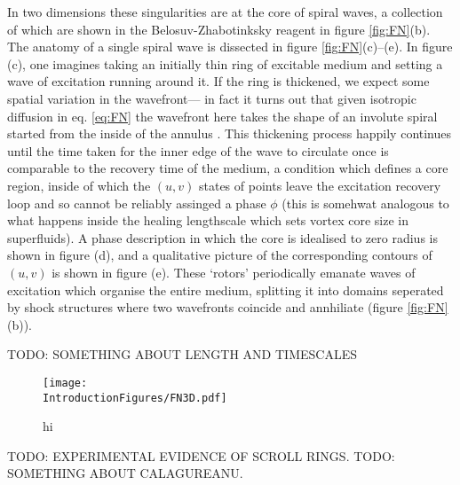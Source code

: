 In two dimensions these singularities are at the core of spiral waves, a collection of which are shown in the Belosuv-Zhabotinksky reagent in figure \ref{fig:FN}(b). The anatomy of a single spiral wave is dissected in figure \ref{fig:FN}(c)--(e). In figure (c), one imagines taking an initially thin ring of excitable medium and setting a wave of excitation running around it. If the ring is thickened, we expect some spatial variation in the wavefront--- in fact it turns out that given isotropic diffusion in eq. \ref{eq:FN} the wavefront here takes the shape of an involute spiral started from the inside of the annulus \cite{}. This thickening process happily continues until the time taken for the inner edge of the wave to circulate once is comparable to the recovery time of the medium, a condition which defines a core region, inside of which the $(u,v)$ states of points leave the excitation recovery loop and so cannot be reliably assinged a phase $\phi$ (this is somehwat analogous to what happens inside the healing lengthscale which sets vortex core size in superfluids). A phase description in which the core is idealised to zero radius is shown in figure (d), and a qualitative picture of the corresponding contours of $(u,v)$ is shown in figure (e). These `rotors' periodically emanate waves of excitation which organise the entire medium, splitting it into domains seperated by shock structures where two wavefronts coincide and annhiliate (figure \ref{fig:FN}(b)).

TODO: SOMETHING ABOUT LENGTH AND TIMESCALES

\begin{figure}[htbp]
\centering
\texttt{[image: \\IntroductionFigures/FN3D.pdf]}
\caption{hi }
\label{fig:FN3D}
\end{figure}
TODO: EXPERIMENTAL EVIDENCE OF SCROLL RINGS.
TODO: SOMETHING ABOUT CALAGUREANU.

